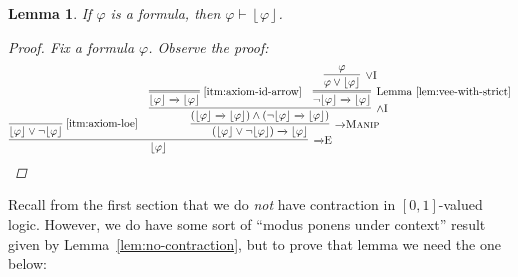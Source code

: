 \documentclass{amsart}
\newtheorem{lemma}[theorem]{Lemma}
\theoremstyle{definition}
\numberwithin{equation}{theorem}
\renewcommand{\phi}{\varphi}
\newcommand{\unvee}{{\vee}}
\newcommand{\unwedge}{{\wedge}}
\newcommand{\proves}{\vdash}
\newcommand{\strict}[1]{{\left\lfloor#1\right\rfloor}}
\newcommand{\narrow}[1]{\xrightarrow{#1}}
\renewcommand{\to}{\narrow{}}
\newcommand{\arr}{{\to}}
\newcommand{\intro}{\!\operatorname{I}}
\newcommand{\elim}{\!\operatorname{E}}
\newcommand{\aref}[1]{\!\text{\ref{itm:axiom-#1}}}
\newcommand{\pushdown}{\arr\text{\sc{Manip}}}
\begin{document}
\begin{lemma}\label{lem:proves-strict}
  If $\phi$ is a formula, then $\phi\proves\strict{\phi}$.
  \begin{proof} 
    Fix a formula $\phi$.
    Observe the proof:
    \[
      \infer[\arr\elim]{\strict\phi}{
        \infer[\aref{loe}]{\strict\phi\vee\neg\strict\phi}{} &
        \infer[\pushdown]{(\strict\phi\vee\neg\strict\phi)\to\strict\phi}{
          \infer[\unwedge\intro]{(\strict\phi\to\strict\phi)\wedge(\neg\strict\phi\to\strict\phi)}{
            \infer=[\aref{id-arrow}]{\strict\phi\to\strict\phi}{} &
            \infer=[\text{Lemma~\ref{lem:vee-with-strict}}]{\neg\strict\phi\to\strict\phi}{
              \infer[\unvee\intro]{\phi\vee\strict\phi}{\phi}
            }
          }
        }
      }\qedhere
    \]
  \end{proof}
\end{lemma}

Recall from the first section that we do \emph{not} have contraction in $[0,1]$-valued logic.
However, we do have some sort of ``modus ponens under context'' result given by Lemma~\ref{lem:no-contraction}, but to prove that lemma we need the one below:
\end{document}

